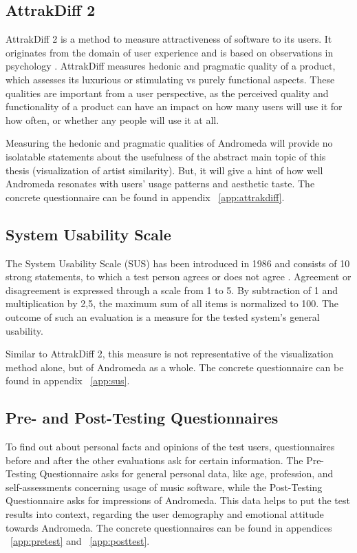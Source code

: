 \subsection{AttrakDiff 2}

AttrakDiff 2 \cite{tubiblio21687} is a method to measure attractiveness of software to its users. It originates from the domain of user experience and is based on observations in psychology \cite{DBLP:journals/ijhci/Hassenzahl01}. AttrakDiff measures hedonic and pragmatic quality of a product, which assesses its luxurious or stimulating vs purely functional aspects. These qualities are important from a user perspective, as the perceived quality and functionality of a product can have an impact on how many users will use it for how often, or whether any people will use it at all.

Measuring the hedonic and pragmatic qualities of Andromeda will provide no isolatable statements about the usefulness of the abstract main topic of this thesis (visualization of artist similarity). But, it will give a hint of how well Andromeda resonates with users' usage patterns and aesthetic taste. The concrete questionnaire can be found in appendix ~\ref{app:attrakdiff}.

\subsection{System Usability Scale}

The System Usability Scale (SUS) has been introduced in 1986 and consists of 10 strong statements, to which a test person agrees or does not agree \cite{Lewis:2009}. Agreement or disagreement is expressed through a scale from 1 to 5. By subtraction of 1 and multiplication by 2,5, the maximum sum of all items is normalized to 100. The outcome of such an evaluation is a measure for the tested system's general usability.

Similar to AttrakDiff 2, this measure is not representative of the visualization method alone, but of Andromeda as a whole. The concrete questionnaire can be found in appendix ~\ref{app:sus}.

\subsection{Pre- and Post-Testing Questionnaires}

To find out about personal facts and opinions of the test users, questionnaires before and after the other evaluations ask for certain information. The Pre-Testing Questionnaire asks for general personal data, like age, profession, and self-assessments concerning usage of music software, while the Post-Testing Questionnaire asks for impressions of Andromeda. This data helps to put the test results into context, regarding the user demography and emotional attitude towards Andromeda. The concrete questionnaires can be found in appendices ~\ref{app:pretest} and ~\ref{app:posttest}.

